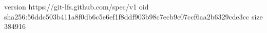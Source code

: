 version https://git-lfs.github.com/spec/v1
oid sha256:56ddc503b411a8f0db6c5e6ef1f8ddf903b98c7ecb9c07ccf6aa2b6329cde3cc
size 384916
